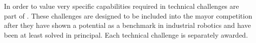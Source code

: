 
In order to value very specific capabilities required in \RCAW technical challenges are part of \RCAW.
These challenges are designed to be included into the mayor competition after they have shown a potential as a benchmark in industrial robotics and have been at least solved in principal.
Each technical challenge is separately awarded. %


